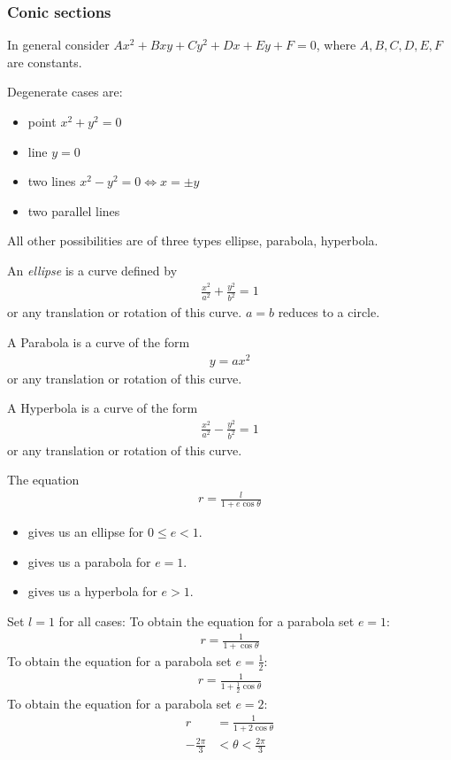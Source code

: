 \subsubsection{Conic sections}

In general consider $A x^2 + Bxy +Cy^2 + Dx + Ey + F = 0$, where $A, B, C, D, E, F$ are constants.

Degenerate cases are:
\begin{itemize}
\item
point $x^2 + y^2 = 0$ 
\item
line $y=0$
\item
two lines $x^2 - y^2 = 0 \Leftrightarrow x = \pm y$
\item
two parallel lines
\end{itemize}

All other possibilities are of three types
ellipse, parabola, hyperbola.
\begin{df}
An \emph{ellipse} is a curve defined by 
\begin{align*}
\frac {x^2}{a^2} + \frac{y^2}{b^2} = 1
\end{align*}
or any translation or rotation of this curve. $a=b$ reduces to a circle.
\end{df}


\begin{df}
A Parabola is a curve of the form
\begin{align*}
y = a x^2
\end{align*}
or any translation or rotation of this curve.
\end{df}

\begin{df}
A Hyperbola is a curve of the form
\begin{align*}
\frac {x^2}{a^2} - \frac{y^2}{b^2} = 1
\end{align*}
or any translation or rotation of this curve.
\end{df}

The equation
\begin{align*}
r = \frac l {1+e \cos \theta}
\end{align*}
\begin{itemize}
\item
gives us an ellipse for $0 \leq e < 1$.
\item
gives us a parabola for $e=1$.
\item
gives us a hyperbola for $e>1$.
\end{itemize}
Set $l=1$ for all cases:
To obtain the equation for a parabola set $e =1$:
\begin{align*}
r = \frac 1 {1+ \cos \theta}
\end{align*}
To obtain the equation for a parabola set $e = \frac 1 2$:
\begin{align*}
r = \frac 1 {1+ \frac 1 2 \cos \theta}
\end{align*}
To obtain the equation for a parabola set $e =2$:
\begin{align*}
r & = \frac 1 {1+ 2 \cos \theta} \\
-\frac{2 \pi} 3 & < \theta < \frac{2 \pi} 3
\end{align*}

